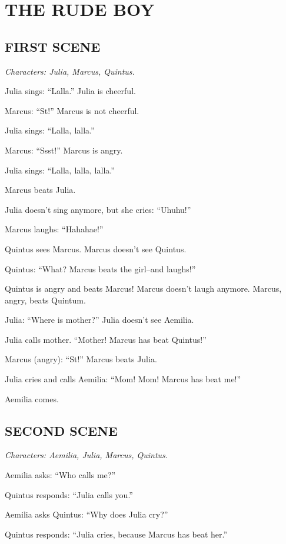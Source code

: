 
\chapter{THE RUDE BOY}

\linenumbers[1]

\section[First scene]{FIRST SCENE}
\emph{Characters: Julia, Marcus, Quintus.}

Julia sings: ``Lalla.'' Julia is cheerful.

Marcus: ``St!'' Marcus is not cheerful.

Julia sings: ``Lalla, lalla.''

Marcus: ``Ssst!'' Marcus is angry.

Julia sings: ``Lalla, lalla, lalla.''

Marcus beats Julia.

Julia doesn't sing anymore, but she cries: ``Uhuhu!''

Marcus laughs: ``Hahahae!''

Quintus sees Marcus. Marcus doesn't see Quintus.

Quintus: ``What? Marcus beats the girl--and laughs!''

Quintus is angry and beats Marcus! Marcus doesn't laugh anymore. Marcus, angry, beats Quintum.

Julia: ``Where is mother?'' Julia doesn't see Aemilia.

Julia calls mother. ``Mother! Marcus has beat Quintus!''

Marcus (angry): ``St!'' Marcus beats Julia.

Julia cries and calls Aemilia: ``Mom! Mom! Marcus has beat me!''

Aemilia comes.

\section[Second scene]{SECOND SCENE}
\emph{Characters: Aemilia, Julia, Marcus, Quintus.}

Aemilia asks: ``Who calls me?''

Quintus responds: ``Julia calls you.''

Aemilia asks Quintus: ``Why does Julia cry?''

Quintus responds: ``Julia cries, because Marcus has beat her.''


